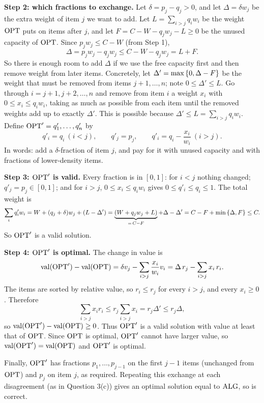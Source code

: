 \documentclass[11pt,addpoints,answers]{exam}
\begin{document}
\begin{questions}
\begin{parts}
\begin{solution}
      \textbf{Step 2: which fractions to exchange.}
      Let $\delta = p_j - q_j > 0$, and let $\Delta = \delta w_j$ be the extra weight of item $j$ we want to add.
      Let $L = \sum_{i > j} q_i w_i$ be the weight $\mathrm{OPT}$ puts on items after $j$, and let $F = C - W - q_j w_j - L \ge 0$ be the unused capacity of $\mathrm{OPT}$.
      Since $p_j w_j \le C - W$ (from Step 1),
      \[
        \Delta = p_j w_j - q_j w_j \le C - W - q_j w_j = L + F .
      \]
      So there is enough room to add $\Delta$ if we use the free capacity first and then remove weight from later items.
      Concretely, let $\Delta' = \max\left\{0, \Delta - F\right\}$ be the weight that must be removed from items $j+1,\dots,n$; note $0 \le \Delta' \le L$.
      Go through $i = j+1, j+2, \dots, n$ and remove from item $i$ a weight $x_i$ with $0 \le x_i \le q_i w_i$, taking as much as possible from each item until the removed weights add up to exactly $\Delta'$.
      This is possible because $\Delta' \le L = \sum_{i>j} q_i w_i$.
      Define $\mathrm{OPT}' = q'_1,\dots,q'_n$ by
      \[
        q'_i = q_i \ (i<j), \qquad q'_j = p_j, \qquad q'_i = q_i - \frac{x_i}{w_i} \ (i>j).
      \]
      In words: add a $\delta$-fraction of item $j$, and pay for it with unused capacity and with fractions of lower-density items.

      \textbf{Step 3: $\mathrm{OPT}'$ is valid.}
      Every fraction is in $[0,1]$: for $i<j$ nothing changed; $q'_j = p_j \in [0,1]$; and for $i > j$, $0 \le x_i \le q_i w_i$ gives $0 \le q'_i \le q_i \le 1$.
      The total weight is
      \[
        \sum_i q'_i w_i
        = W + (q_j + \delta) w_j + (L - \Delta')
        = \underbrace{(W + q_j w_j + L)}_{=\,C - F} + \Delta - \Delta'
        = C - F + \min\left\{\Delta, F\right\} \le C .
      \]
      So $\mathrm{OPT}'$ is a valid solution.

      \textbf{Step 4: $\mathrm{OPT}'$ is optimal.}
      The change in value is
      \[
        \text{val}(\mathrm{OPT}') - \text{val}(\mathrm{OPT}) = \delta v_j - \sum_{i>j} \frac{x_i}{w_i} v_i = \Delta\, r_j - \sum_{i>j} x_i\, r_i .
      \]
      The items are sorted by relative value, so $r_i \le r_j$ for every $i > j$, and every $x_i \ge 0$.
      Therefore
      \[
        \sum_{i>j} x_i r_i \le r_j \sum_{i>j} x_i = r_j \Delta' \le r_j \Delta,
      \]
      so $\text{val}(\mathrm{OPT}') - \text{val}(\mathrm{OPT}) \ge 0$.
      Thus $\mathrm{OPT}'$ is a valid solution with value at least that of $\mathrm{OPT}$.
      Since $\mathrm{OPT}$ is optimal, $\mathrm{OPT}'$ cannot have larger value, so $\text{val}(\mathrm{OPT}') = \text{val}(\mathrm{OPT})$ and $\mathrm{OPT}'$ is optimal.

      Finally, $\mathrm{OPT}'$ has fractions $p_1,\dots,p_{j-1}$ on the first $j-1$ items (unchanged from $\mathrm{OPT}$) and $p_j$ on item $j$, as required.
      Repeating this exchange at each disagreement (as in Question 3(c)) gives an optimal solution equal to $\mathrm{ALG}$, so  is correct.
    \end{solution}


\end{parts}
\end{questions}
\end{document}
